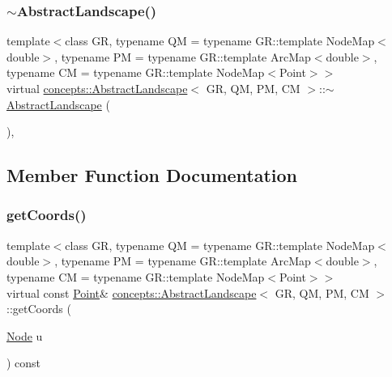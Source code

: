 \mbox{\label{classconcepts_1_1_abstract_landscape_a1aa9716037a8210d16987793224ce305}} 
\subsubsection{\texorpdfstring{$\sim$\+Abstract\+Landscape()}{~AbstractLandscape()}}
{\footnotesize\ttfamily template$<$class GR, typename QM = typename G\+R\+::template Node\+Map$<$double$>$, typename PM = typename G\+R\+::template Arc\+Map$<$double$>$, typename CM = typename G\+R\+::template Node\+Map$<$\+Point$>$$>$ \\
virtual \hyperlink{classconcepts_1_1_abstract_landscape}{concepts\+::\+Abstract\+Landscape}$<$ GR, QM, PM, CM $>$\+::$\sim$\hyperlink{classconcepts_1_1_abstract_landscape}{Abstract\+Landscape} (\begin{DoxyParamCaption}{ }\end{DoxyParamCaption})\hspace{0.3cm}{\ttfamily [inline]}, {\ttfamily [virtual]}}



\subsection{Member Function Documentation}
\mbox{\label{classconcepts_1_1_abstract_landscape_a7d0a8d666d3c712899e34cbf6f322027}} 
\subsubsection{\texorpdfstring{get\+Coords()}{getCoords()}}
{\footnotesize\ttfamily template$<$class GR, typename QM = typename G\+R\+::template Node\+Map$<$double$>$, typename PM = typename G\+R\+::template Arc\+Map$<$double$>$, typename CM = typename G\+R\+::template Node\+Map$<$\+Point$>$$>$ \\
virtual const \hyperlink{abstract__landscape_8hpp_a9c14bcba65b035519a9c98f1eb1babbe}{Point}\& \hyperlink{classconcepts_1_1_abstract_landscape}{concepts\+::\+Abstract\+Landscape}$<$ GR, QM, PM, CM $>$\+::get\+Coords (\begin{DoxyParamCaption}\item[{\hyperlink{classconcepts_1_1_abstract_landscape_a7c2f90fb9f42302f1af84a59f4df4b91}{Node}}]{u }\end{DoxyParamCaption}) const\hspace{0.3cm}{\ttfamily [pure virtual]}}

